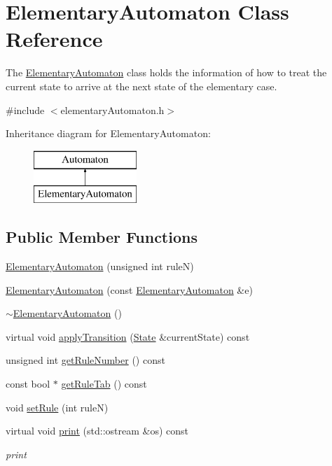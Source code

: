 \hypertarget{class_elementary_automaton}{}\section{Elementary\+Automaton Class Reference}
\label{class_elementary_automaton}


The \mbox{\hyperlink{class_elementary_automaton}{Elementary\+Automaton}} class holds the information of how to treat the current state to arrive at the next state of the elementary case.  




{\ttfamily \#include $<$elementary\+Automaton.\+h$>$}

Inheritance diagram for Elementary\+Automaton\+:\begin{figure}[H]
\begin{center}
\leavevmode
\includegraphics[height=2.000000cm]{class_elementary_automaton}
\end{center}
\end{figure}
\subsection*{Public Member Functions}
\begin{DoxyCompactItemize}
\item 
\mbox{\hyperlink{class_elementary_automaton_a9593b026bdc4340f9263f73e0732617a}{Elementary\+Automaton}} (unsigned int ruleN)
\item 
\mbox{\hyperlink{class_elementary_automaton_a30ef73987f7375a4421c1751872e2034}{Elementary\+Automaton}} (const \mbox{\hyperlink{class_elementary_automaton}{Elementary\+Automaton}} \&e)
\item 
\mbox{\hyperlink{class_elementary_automaton_a95bcbaa9024f2fdfd0c2196656d78a98}{$\sim$\+Elementary\+Automaton}} ()
\item 
virtual void \mbox{\hyperlink{class_elementary_automaton_a338559546b22deef0f3eb3c0d7d20882}{apply\+Transition}} (\mbox{\hyperlink{class_state}{State}} \&current\+State) const
\item 
unsigned int \mbox{\hyperlink{class_elementary_automaton_a38f3a217931e1ccf52fcdbad01d7ff55}{get\+Rule\+Number}} () const
\item 
const bool $\ast$ \mbox{\hyperlink{class_elementary_automaton_a585b7a59111245096079cf52bd4dbe96}{get\+Rule\+Tab}} () const
\item 
void \mbox{\hyperlink{class_elementary_automaton_a211959d8ca064251019c2f6c3ad2840a}{set\+Rule}} (int ruleN)
\item 
virtual void \mbox{\hyperlink{class_elementary_automaton_ab52f80f6998fd5324da2268d846b45cb}{print}} (std\+::ostream \&os) const
\begin{DoxyCompactList}\small\item\em print \end{DoxyCompactList}\end{DoxyCompactItemize}
